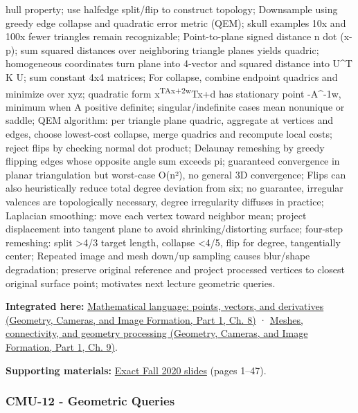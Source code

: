 hull property; use halfedge split/flip to construct topology; Downsample using greedy edge collapse and quadratic error metric (QEM); skull examples 10x and 100x fewer triangles remain recognizable; Point-to-plane signed distance n dot (x-p); sum squared distances over neighboring triangle planes yields quadric; homogeneous coordinates turn plane into 4-vector and squared distance into U\^{}T K U; sum constant 4x4 matrices; For collapse, combine endpoint quadrics and minimize over xyz; quadratic form x\textsuperscript{TAx+2w}Tx+d has stationary point -A\^{}-1w, minimum when A positive definite; singular/indefinite cases mean nonunique or saddle; QEM algorithm: per triangle plane quadric, aggregate at vertices and edges, choose lowest-cost collapse, merge quadrics and recompute local costs; reject flips by checking normal dot product; Delaunay remeshing by greedy flipping edges whose opposite angle sum exceeds pi; guaranteed convergence in planar triangulation but worst-case O(n²), no general 3D convergence; Flips can also heuristically reduce total degree deviation from six; no guarantee, irregular valences are topologically necessary, degree irregularity diffuses in practice; Laplacian smoothing: move each vertex toward neighbor mean; project displacement into tangent plane to avoid shrinking/distorting surface; four-step remeshing: split \textgreater4/3 target length, collapse \textless4/5, flip for degree, tangentially center; Repeated image and mesh down/up sampling causes blur/shape degradation; preserve original reference and project processed vertices to closest original surface point; motivates next lecture geometric queries.

\textbf{Integrated here:} \href{../03-Geometry-Cameras-and-Image-Formation-P01/main.pdf\#03-visual-computing-i-ch001-mathematical-language-points-vectors-and-derivatives}{Mathematical language: points, vectors, and derivatives (Geometry, Cameras, and Image Formation, Part 1, Ch. 8)} · \href{../03-Geometry-Cameras-and-Image-Formation-P01/main.pdf\#03-visual-computing-i-ch002-meshes-connectivity-and-geometry-processing}{Meshes, connectivity, and geometry processing (Geometry, Cameras, and Image Formation, Part 1, Ch. 9)}.

\textbf{Supporting materials:} \href{https://15462.courses.cs.cmu.edu/fall2020content/lectures/11_geometryprocessing/11_geometryprocessing_slides.pdf}{Exact Fall 2020 slides} (pages 1--47).

\subsubsection{CMU-12 - Geometric Queries}\label{04-visual-computing-ii-ch036-cmu-12---geometric-queries}

